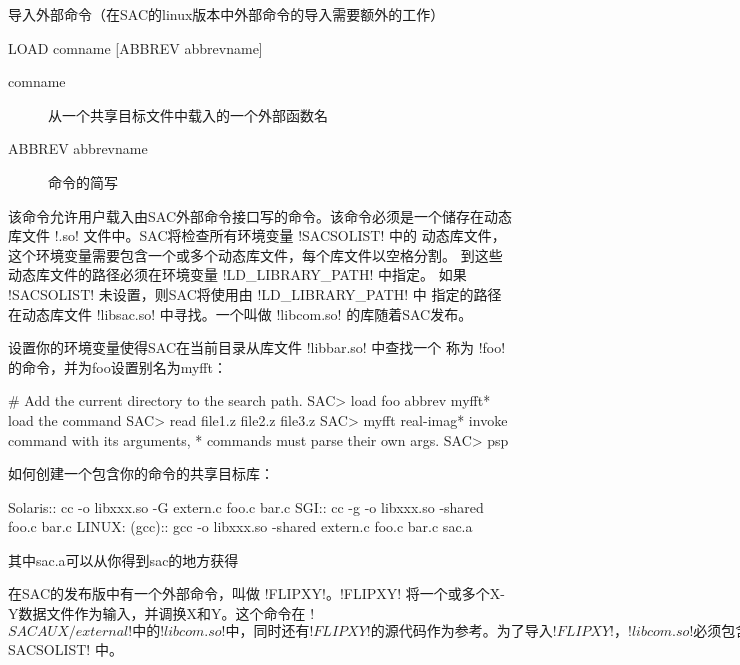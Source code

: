 \label{cmd:load}

导入外部命令（在SAC的linux版本中外部命令的导入需要额外的工作）

\begin{SACSTX}
LOAD comname [ABBREV abbrevname]
\end{SACSTX}

\begin{description}
\item [comname] 从一个共享目标文件中载入的一个外部函数名
\item [ABBREV abbrevname] 命令的简写
\end{description}

该命令允许用户载入由SAC外部命令接口写的命令。该命令必须是一个储存在动态
库文件 !.so! 文件中。SAC将检查所有环境变量 !SACSOLIST! 中的
动态库文件，这个环境变量需要包含一个或多个动态库文件，每个库文件以空格分割。
到这些动态库文件的路径必须在环境变量 !LD_LIBRARY_PATH! 中指定。
如果 !SACSOLIST! 未设置，则SAC将使用由 !LD_LIBRARY_PATH! 中
指定的路径在动态库文件 !libsac.so! 中寻找。一个叫做 !libcom.so!
的库随着SAC发布。

设置你的环境变量使得SAC在当前目录从库文件 !libbar.so! 中查找一个
称为 !foo! 的命令，并为foo设置别名为myfft：
\begin{SACCode}
#  Add the current directory to the search path.
SAC> load foo abbrev myfft* load the command
SAC> read file1.z file2.z file3.z
SAC> myfft real-imag* invoke command with its arguments,
* commands must parse their own args.
SAC> psp
\end{SACCode}

如何创建一个包含你的命令的共享目标库：
\begin{SACCode}
Solaris::
cc -o libxxx.so -G extern.c foo.c bar.c
SGI::
cc -g -o libxxx.so -shared foo.c bar.c
LINUX: (gcc)::
gcc -o libxxx.so -shared extern.c foo.c bar.c sac.a
\end{SACCode}
其中sac.a可以从你得到sac的地方获得

在SAC的发布版中有一个外部命令，叫做 !FLIPXY!。!FLIPXY!
将一个或多个X-Y数据文件作为输入，并调换X和Y。这个命令在 !${SACAUX}/external!
中的 !libcom.so! 中，同时还有 !FLIPXY! 的源代码作为参考。
为了导入 !FLIPXY!，!libcom.so! 必须包含在 !$SACSOLIST! 中。
